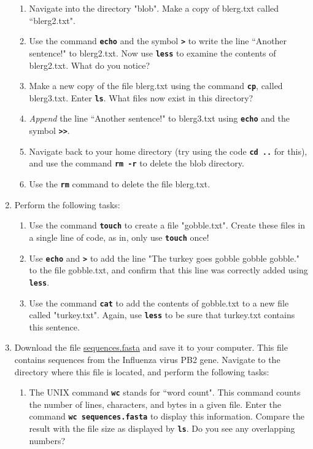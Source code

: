\documentclass{article}[12pt]
\newcommand{\code}[1]{\textbf{\texttt{#1}}}
\begin{document}
\begin{enumerate}[itemsep=5ex]
\begin{enumerate}[itemsep=2ex]
		\item Navigate into the directory "blob". Make a copy of blerg.txt called ``blerg2.txt".
		
		\item Use the command \code{echo} and the symbol \code{>} to write the line ``Another sentence!" to blerg2.txt. Now use \code{less} to examine the contents of blerg2.txt. What do you notice?
		
		\item Make a new copy of the file blerg.txt using the command \code{cp}, called blerg3.txt. Enter \code{ls}. What files now exist in this directory?
		
		\item \emph{Append} the line ``Another sentence!" to blerg3.txt using \code{echo} and the symbol \code{>>}. 
		
		\item Navigate back to your home directory (try using the code \code{cd ..} for this), and use the command \code{rm -r} to delete the blob directory.	
	
		\item Use the \code{rm} command to delete the file blerg.txt.
	\end{enumerate} 
	
	\item Perform the following tasks:
		\begin{enumerate}[itemsep=2ex]
			\item Use the command \code{touch} to create a file "gobble.txt". Create these files in a single line of code, as in, only use \code{touch} once!
			
			\item Use \code{echo} and \code{>} to add the line "The turkey goes gobble gobble gobble." to the file gobble.txt, and confirm that this line was correctly added using \code{less}.
			
			\item Use the command \code{cat} to add the contents of gobble.txt to a new file called "turkey.txt". Again, use \code{less} to be sure that turkey.txt contains this sentence.		
		\end{enumerate}
	
	
	\item Download the file \href{https://github.com/sjspielman/ccbb_bigdata2015_python/exercises/sequences.fasta}{sequences.fasta} and save it to your computer. This file contains sequences from the Influenza virus PB2 gene. Navigate to the directory where this file is located, and perform the following tasks:
	\begin{enumerate}[itemsep=2ex]
		\item The UNIX command \code{wc} stands for ``word count". This command counts the number of lines, characters, and bytes in a given file. Enter the command \code{wc sequences.fasta} to display this information. Compare the result with the file size as displayed by \code{ls}. Do you see any overlapping numbers?
		

\end{enumerate}
\end{enumerate}
\end{document}
